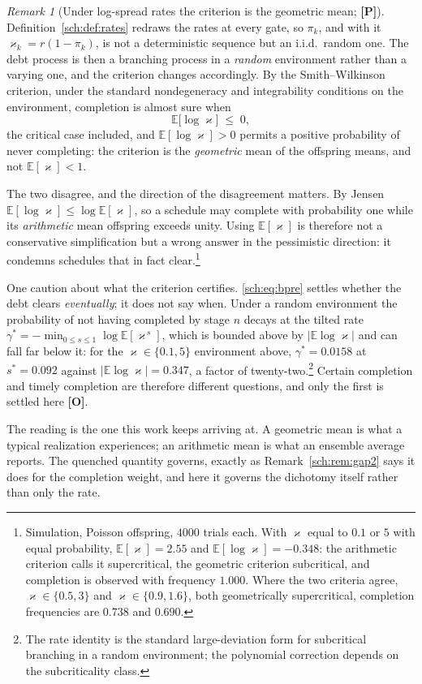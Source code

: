 \documentclass[11pt]{article}
\newcommand{\E}{\mathbb{E}}
\theoremstyle{plain}
\theoremstyle{definition}
\theoremstyle{remark}
\newtheorem{remark}[theorem]{Remark}
\begin{document}
\begin{remark}[Under log-spread rates the criterion is the geometric
mean; \textbf{[P]}]\label{sch:rem:bpre}
Definition~\ref{sch:def:rates} redraws the rates at every gate, so
$\pi_k$, and with it $\varkappa_k=r(1-\pi_k)$, is not a deterministic
sequence but an i.i.d.\ random one. The debt process is then a branching
process in a \emph{random} environment rather than a varying one, and the
criterion changes accordingly. By the Smith--Wilkinson criterion, under the standard nondegeneracy
and integrability conditions on the environment, completion is almost
sure when
\begin{equation}\label{sch:eq:bpre}
\E\bigl[\log \varkappa\bigr]\;\le\;0,
\end{equation}
the critical case included, and $\E[\log\varkappa]>0$ permits a positive
probability of never completing: the criterion is the \emph{geometric}
mean of the offspring means, and not $\E[\varkappa]<1$.

The two disagree, and the direction of the disagreement matters. By
Jensen $\E[\log \varkappa]\le\log\E[\varkappa]$, so a schedule may complete with
probability one while its \emph{arithmetic} mean offspring exceeds
unity. Using $\E[\varkappa]$ is therefore not a conservative simplification but
a wrong answer in the pessimistic direction: it condemns schedules that
in fact clear.\footnote{Simulation, Poisson offspring, $4000$ trials
each. With $\varkappa$ equal to $0.1$ or $5$ with equal probability,
$\E[\varkappa]=2.55$ and $\E[\log \varkappa]=-0.348$: the arithmetic criterion calls it
supercritical, the geometric criterion subcritical, and completion is
observed with frequency $1.000$. Where the two criteria agree, $\varkappa\in\{0.5,3\}$ and $\varkappa\in\{0.9,1.6\}$, both geometrically supercritical, completion frequencies are $0.738$ and $0.690$.}

One caution about what the criterion certifies. \eqref{sch:eq:bpre}
settles whether the debt clears \emph{eventually}; it does not say when.
Under a random environment the probability of not having completed by
stage $n$ decays at the tilted rate
$\gamma^\ast=-\min_{0\le s\le1}\log\E[\varkappa^{\,s}]$, which is bounded
above by $|\E\log\varkappa|$ and can fall far below it: for the
$\varkappa\in\{0.1,5\}$ environment above, $\gamma^\ast=0.0158$ at
$s^\ast=0.092$ against $|\E\log\varkappa|=0.347$, a factor of
twenty-two.\footnote{The rate identity is the standard large-deviation
form for subcritical branching in a random environment; the polynomial
correction depends on the subcriticality class.} Certain completion and
timely completion are therefore different questions, and only the first
is settled here \textbf{[O]}.

The reading is the one this work keeps arriving at. A geometric mean is
what a typical realization experiences; an arithmetic mean is what an
ensemble average reports. The quenched quantity governs, exactly as
Remark~\ref{sch:rem:gap2} says it does for the completion weight, and
here it governs the dichotomy itself rather than only the rate.
\end{remark}
\end{document}
